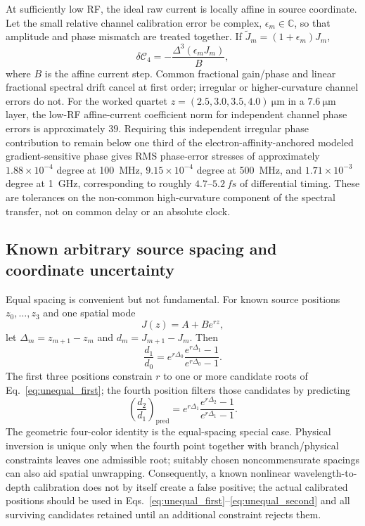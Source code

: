 \documentclass[11pt]{article}
\newcommand{\Cfour}{\mathcal{C}_4}
\begin{document}
At sufficiently low RF, the ideal raw current is locally affine in source coordinate. Let the small relative channel calibration error be complex, $\epsilon_m\in\mathbb C$, so that amplitude and phase mismatch are treated together. If $\widetilde J_m=(1+\epsilon_m)J_m$,
\begin{equation}
\boxed{
\delta\Cfour=-\frac{\Delta^3(\epsilon_mJ_m)}{B},}
\label{eq:ampcal}
\end{equation}
where $B$ is the affine current step. Common fractional gain/phase and linear fractional spectral drift cancel at first order; irregular or higher-curvature channel errors do not. For the worked quartet $z=(2.5,3.0,3.5,4.0)~\si{\micro\meter}$ in a $7.6~\si{\micro\meter}$ layer, the low-RF affine-current coefficient norm for independent channel phase errors is approximately $39$. Requiring this independent irregular phase contribution to remain below one third of the electron-affinity-anchored modeled gradient-sensitive phase gives RMS phase-error stresses of approximately $1.88\times10^{-4}$ degree at \SI{100}{MHz}, $9.15\times10^{-4}$ degree at \SI{500}{MHz}, and $1.71\times10^{-3}$ degree at \SI{1}{GHz}, corresponding to roughly $4.7$--$5.2~\si{fs}$ of differential timing. These are tolerances on the non-common high-curvature component of the spectral transfer, not on common delay or an absolute clock.

\subsection{Known arbitrary source spacing and coordinate uncertainty}

Equal spacing is convenient but not fundamental. For known source positions $z_0,\ldots,z_3$ and one spatial mode
\begin{equation}
J(z)=A+B e^{rz},
\end{equation}
let $\Delta_m=z_{m+1}-z_m$ and $d_m=J_{m+1}-J_m$. Then
\begin{equation}
\boxed{
\frac{d_1}{d_0}
=e^{r\Delta_0}
\frac{e^{r\Delta_1}-1}{e^{r\Delta_0}-1}.}
\label{eq:unequal_first}
\end{equation}
The first three positions constrain $r$ to one or more candidate roots of Eq.~\eqref{eq:unequal_first}; the fourth position filters those candidates by predicting
\begin{equation}
\boxed{
\left(\frac{d_2}{d_1}\right)_{\mathrm{pred}}
=e^{r\Delta_1}
\frac{e^{r\Delta_2}-1}{e^{r\Delta_1}-1}.}
\label{eq:unequal_second}
\end{equation}
The geometric four-color identity is the equal-spacing special case. Physical inversion is unique only when the fourth point together with branch/physical constraints leaves one admissible root; suitably chosen noncommensurate spacings can also aid spatial unwrapping. Consequently, a known nonlinear wavelength-to-depth calibration does not by itself create a false positive; the actual calibrated positions should be used in Eqs.~\eqref{eq:unequal_first}--\eqref{eq:unequal_second} and all surviving candidates retained until an additional constraint rejects them.
\end{document}
